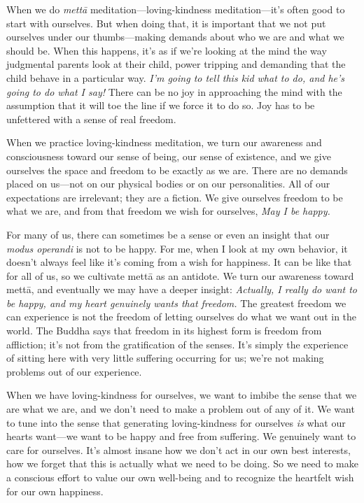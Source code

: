 
When we do \emph{mettā} meditation---loving-kindness meditation---it's 
often good to start with ourselves. But when doing that, it is 
important that we not put ourselves under our thumbs---making demands 
about who we are and what we should be. When this happens, it's as if 
we're looking at the mind the way judgmental parents look at their 
child, power tripping and demanding that the child behave in a 
particular way. \emph{I'm going to tell this kid what to do, and he's 
going to do what I say!} There can be no joy in approaching the mind 
with the assumption that it will toe the line if we force it to do so. 
Joy has to be unfettered with a sense of real freedom.

When we practice loving-kindness meditation, we turn our awareness and 
consciousness toward our sense of being, our sense of existence, and we 
give ourselves the space and freedom to be exactly as we are. There are 
no demands placed on us---not on our physical bodies or on our 
personalities. All of our expectations are irrelevant; they are a 
fiction. We give ourselves freedom to be what we are, and from that 
freedom we wish for ourselves, \emph{May I be happy.}

For many of us, there can sometimes be a sense or even an insight that 
our \emph{modus operandi} is not to be happy. For me, when I look at my 
own behavior, it doesn't always feel like it's coming from a wish for 
happiness. It can be like that for all of us, so we cultivate mettā as 
an antidote. We turn our awareness toward mettā, and eventually we may 
have a deeper insight: \emph{Actually, I really do want to be happy, 
and my heart genuinely wants that freedom.} The greatest freedom we can 
experience is not the freedom of letting ourselves do what we want out 
in the world. The Buddha says that freedom in its highest form is 
freedom from affliction; it's not from the gratification of the senses. 
It's simply the experience of sitting here with very little suffering 
occurring for us; we're not making problems out of our experience.

When we have loving-kindness for ourselves, we want to imbibe the sense 
that we are what we are, and we don't need to make a problem out of any 
of it. We want to tune into the sense that generating loving-kindness 
for ourselves \emph{is} what our hearts want---we want to be happy and 
free from suffering. We genuinely want to care for ourselves. It's 
almost insane how we don't act in our own best interests, how we forget 
that this is actually what we need to be doing. So we need to make a 
conscious effort to value our own well-being and to recognize the 
heartfelt wish for our own happiness.

